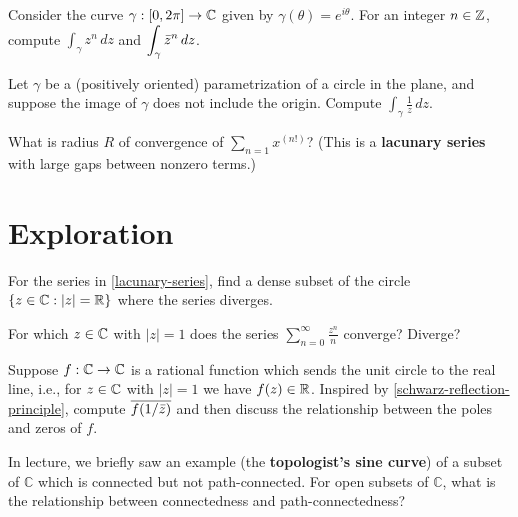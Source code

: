 \documentclass{homework}
\begin{document}
\begin{problem}\label{integral-powers-of-z}Consider the curve $\gamma : [0,2\pi] \to \mathbb{C}$ given by $\gamma(\theta) = e^{i\theta}$.  For an integer $n \in \mathbb{Z}$, compute $\displaystyle\int_\gamma z^n \, dz$ and $\displaystyle\int_\gamma \bar{z}^n \, dz$.
\end{problem}

\begin{problem}\label{one-over-z-around-circle}Let $\gamma$ be a (positively oriented) parametrization of a circle
  in the plane, and suppose the image of $\gamma$ does not include the
  origin.  Compute $\displaystyle\int_\gamma \frac{1}{z} \, dz$.
\end{problem}

\begin{problem}\label{lacunary-series}What is radius $R$ of convergence of
  $\displaystyle\sum_{n=1} x^{(n!)}$?  (This is a \textbf{lacunary
    series} with large gaps between nonzero terms.)
\end{problem}


\section{Exploration}

\begin{problem}For the series in \ref{lacunary-series}, find a dense
  subset of the circle $\{ z \in \mathbb{C} : \left|z\right| = \mathbb{R} \}$ where the series
  diverges.
\end{problem}
  
\begin{problem}
  For which $z \in \mathbb{C}$ with $|z|=1$ does the series
  $\displaystyle\sum_{n=0}^{\infty} \frac{z^n}{n}$ converge?  Diverge?
\end{problem}

\begin{problem}Suppose $f : \mathbb{C} \to \mathbb{C}$ is a rational function which
  sends the unit circle to the real line, i.e., for $z \in \mathbb{C}$ with
  $|z| = 1$ we have $f(z) \in \mathbb{R}$.  Inspired
  by \ref{schwarz-reflection-principle}, compute
  $\overline{f(1/\bar{z})}$ and then discuss the relationship between
  the poles and zeros of $f$.
\end{problem}

\begin{problem}In lecture, we briefly saw an example (the
  \textbf{topologist's sine curve}) of a subset of $\mathbb{C}$ which
  is connected but not path-connected.  For open subsets of
  $\mathbb{C}$, what is the relationship between connectedness and
  path-connectedness?
\end{problem}
\end{document}
